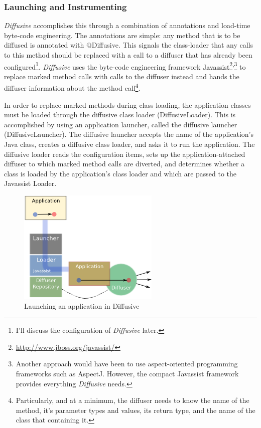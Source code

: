 \documentclass[11pt]{article}
\begin{document}
\subsubsection{Launching and Instrumenting\label{sec:launching_and_instrumenting}}
\emph{Diffusive} accomplishes this through a combination of annotations and load-time byte-code engineering. The annotations are simple: any method that is to be diffused is annotated with \textsf{@Diffusive}. This signals the class-loader that any calls to this method should be replaced with a call to a diffuser that has already been configured\footnote{I'll discuss the configuration of \emph{Diffusive} later.}. \emph{Diffusive} uses the byte-code engineering framework \href{http://www.jboss.org/javassist/}{Javassist}\footnote{\url{http://www.jboss.org/javassist/}}\textsuperscript{,}\footnote{Another approach would have been to use aspect-oriented programming frameworks such as AspectJ. However, the compact Javassist framework provides everything \emph{Diffusive} needs.} to replace marked method calls with calls to the diffuser instead and hands the diffuser information about the method call\footnote{Particularly, and at a minimum, the diffuser needs to know the name of the method, it's parameter types and values, its return type, and the name of the class that containing it.}.

In order to replace marked methods during class-loading, the application classes must be loaded through the diffusive class loader (\textsf{DiffusiveLoader}). This is accomplished by using an application launcher, called the diffusive launcher (\textsf{DiffusiveLauncher}). The diffusive launcher accepts the name of the application's Java class, creates a diffusive class loader, and asks it to run the application. The diffusive loader reads the configuration items, sets up the application-attached diffuser to which marked method calls are diverted, and determines whether a class is loaded by the application's class loader and which are passed to the Javassist \textsf{Loader}.

\begin{figure}[htbp]
\begin{center}
\includegraphics{diffusive_launcher}
\caption{Launching an application in Diffusive}
\label{fig:diffusive_launch_application}
\end{center}
\end{figure}
\end{document}
